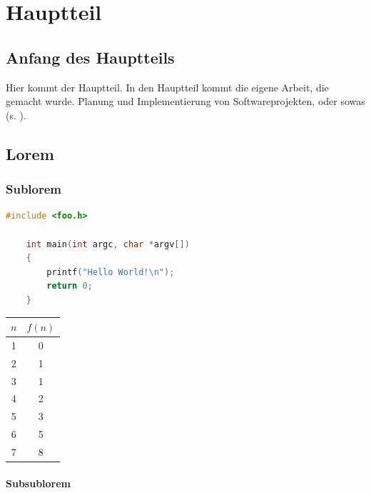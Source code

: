\chapter{Hauptteil}

\section{Anfang des Hauptteils}

Hier kommt der Hauptteil.
In den Hauptteil kommt die eigene Arbeit, die gemacht wurde.
Planung und Implementierung von Softwareprojekten, oder sowas (s. \cite{knuth84}).

\section{Lorem}

\lipsum[1-3]

\subsection{Sublorem}

\begin{lstlisting}[language=c]
    #include <foo.h>

    int main(int argc, char *argv[])
    {
        printf("Hello World!\n");
        return 0;
    }
\end{lstlisting}

\lipsum[2-3]

\begin{table}[h]
    \centering
    \begin{tabular}{c|c}
        $n$ & $f(n)$ \\ \hline
        1   & 0      \\
        2   & 1      \\
        3   & 1      \\
        4   & 2      \\
        5   & 3      \\
        6   & 5      \\
        7   & 8      \\
    \end{tabular}
\end{table}

\subsubsection{Subsublorem}

